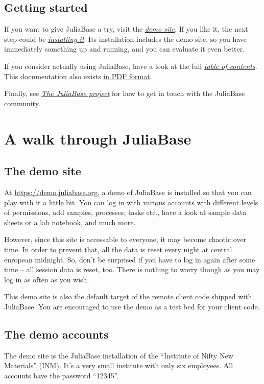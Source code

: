 \documentclass[a4paper,11pt,english]{sphinxmanual}
\begin{document}
\section{Getting started}
\label{index:getting-started}\label{index:django-web-framework}
If you want to give JuliaBase a try, visit the {\hyperref[demo::doc]{\emph{demo site}}}.  If you
like it, the next step could be {\hyperref[programming/installation::doc]{\emph{installing it}}}.  Its installation includes the demo site, so you
have immediately something up and running, and you can evaluate it even better.

If you consider actually using JuliaBase, have a look at the full {\hyperref[toc::doc]{\emph{table
of contents}}}.  This documentation also exists \href{http://www.juliabase.org/juliabase.pdf}{in PDF format}.

Finally, see {\hyperref[project::doc]{\emph{The JuliaBase project}}} for how to get in touch with the JuliaBase
community.


\chapter{A walk through JuliaBase}
\label{demo:a-walk-through-juliabase}\label{demo::doc}

\section{The demo site}
\label{demo:the-demo-site}\label{demo:index-0}
At \href{https://demo.juliabase.org}{https://demo.juliabase.org}, a demo of JuliaBase is installed so that you can
play with it a little bit.  You can log in with various accounts with different
levels of permissions, add samples, processes, tasks etc., have a look at
sample data sheets or a lab notebook, and much more.

However, since this site is accessable to everyone, it may become chaotic over
time.  In order to prevent that, all the data is reset every night at central
european midnight.  So, don't be surprised if you have to log in again after
some time – all session data is reset, too.  There is nothing to worry though
as you may log in as often as you wish.

This demo site is also the default target of the remote client code shipped
with JuliaBase.  You are encouraged to use the demo as a test bed for your
client code.


\section{The demo accounts}
\label{demo:the-demo-accounts}
The demo site is the JuliaBase installation of the “Institute of Nifty New
Materials” (INM).  It's a very small institute with only six employees.  All
accounts have the password “12345”.
\end{document}
